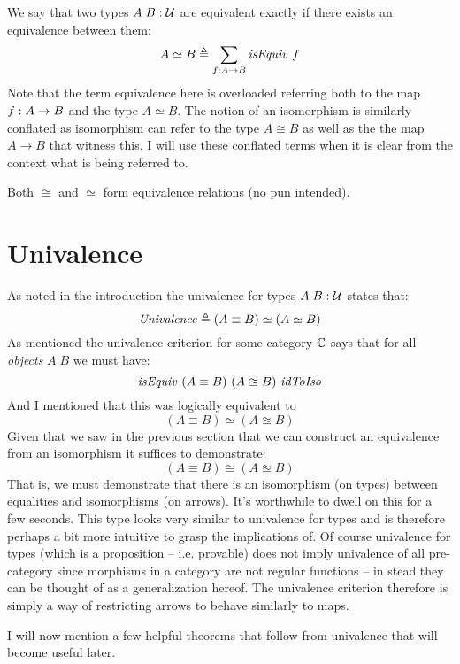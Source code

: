 We say that two types $A\;B \mathrel{:} \mathcal{U}$ are equivalent exactly if there exists an
equivalence between them:
%
\begin{equation}
\label{eq:equivalence}
A \simeq B \mathrel{\triangleq} \sum_{f \mathrel{:} A \to B} \mathit{isEquiv}\ f
\end{equation}
%
Note that the term equivalence here is overloaded referring both to the map $f
\mathrel{:} A \to B$ and the type $A \simeq B$. The notion of an isomorphism is
similarly conflated as isomorphism can refer to the type $A \cong B$ as well as
the the map $A \to B$ that witness this. I will use these conflated terms when
it is clear from the context what is being referred to.

Both $\cong$ and $\simeq$ form equivalence relations (no pun intended).

\section{Univalence}
\label{sec:univalence}
As noted in the introduction the univalence for types $A\; B \mathrel{:} \mathcal{U}$ states
that:
%
$$
\mathit{Univalence} \mathrel{\triangleq} (A \equiv B) \simeq (A \simeq B)
$$
%
As mentioned the univalence criterion for some category $\mathbb{C}$ says that for all
\emph{objects} $A\;B$ we must have:
$$
\mathit{isEquiv}\ (A \equiv B)\ (A \approxeq B)\ \mathit{idToIso}
$$
And I mentioned that this was logically equivalent to
%
$$
(A \equiv B) \simeq (A \approxeq B)
$$
%
Given that we saw in the previous section that we can construct an equivalence
from an isomorphism it suffices to demonstrate:
%
$$
(A \equiv B) \cong (A \approxeq B)
$$
%
That is, we must demonstrate that there is an isomorphism (on types) between
equalities and isomorphisms (on arrows). It's worthwhile to dwell on this for a
few seconds. This type looks very similar to univalence for types and is
therefore perhaps a bit more intuitive to grasp the implications of. Of course
univalence for types (which is a proposition -- i.e. provable) does not imply
univalence of all pre-category since morphisms in a category are not regular
functions -- in stead they can be thought of as a generalization hereof. The univalence criterion therefore is simply a way of restricting arrows
to behave similarly to maps.

I will now mention a few helpful theorems that follow from univalence that will
become useful later.

